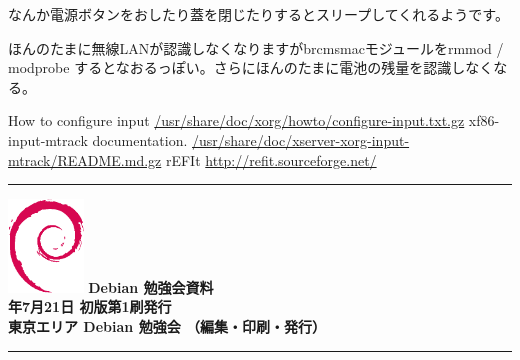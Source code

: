\documentclass[mingoth,a4paper]{jsarticle}
\newcommand{\debmtgyear}{2012}
\newcommand{\debmtgmonth}{7}
\newcommand{\debmtgdate}{21}
\begin{document}
なんか電源ボタンをおしたり蓋を閉じたりするとスリープしてくれるようです。

ほんのたまに無線LANが認識しなくなりますがbrcmsmacモジュールをrmmod / modprobe
するとなおるっぽい。さらにほんのたまに電池の残量を認識しなくなる。

\begin{thebibliography}{0}
	How to configure input
	\url{/usr/share/doc/xorg/howto/configure-input.txt.gz}
	xf86-input-mtrack documentation.
	\url{/usr/share/doc/xserver-xorg-input-mtrack/README.md.gz}
 rEFIt \url{http://refit.sourceforge.net/}
\end{thebibliography}



\cleartooddpage

\vspace*{15cm}
\hrule
\vspace{2mm}
\includegraphics[width=2cm]{image200502/openlogo-nd.eps}
\noindent \Large \bf Debian 勉強会資料\\
\noindent \normalfont \debmtgyear{}年\debmtgmonth{}月\debmtgdate{}日 \hspace{5mm}  初版第1刷発行\\
\noindent \normalfont 東京エリア Debian 勉強会 （編集・印刷・発行）\\
\hrule
\end{document}
